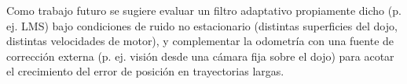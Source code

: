 Como trabajo futuro se sugiere evaluar un filtro adaptativo propiamente dicho (p. ej. LMS) bajo condiciones de ruido no estacionario (distintas superficies del dojo, distintas velocidades de motor), y complementar la odometría con una fuente de corrección externa (p. ej. visión desde una cámara fija sobre el dojo) para acotar el crecimiento del error de posición en trayectorias largas.
